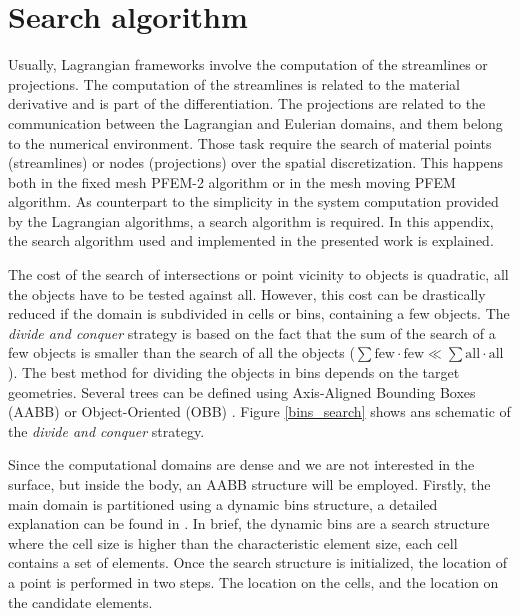 
\chapter{Search algorithm}
\label{search_algorithm}



Usually, Lagrangian frameworks involve the computation of the streamlines or projections. The computation of the streamlines is related to the material derivative and is part of the differentiation. The projections are related to the communication between the Lagrangian and Eulerian domains, and them belong to the numerical environment. Those task require the search of material points (streamlines) or nodes (projections) over the spatial discretization. This happens both in the fixed mesh PFEM-2 algorithm or in the mesh moving PFEM algorithm. As counterpart to the simplicity in the system computation provided by the Lagrangian algorithms, a search algorithm is required. In this appendix, the search algorithm used and implemented in the presented work is explained.

The cost of the search of intersections or point vicinity to objects is quadratic, all the objects have to be tested against all. However, this cost can be drastically reduced if the domain is subdivided in cells or bins, containing a few objects. 
The \emph{divide and conquer} strategy is based on the fact that the sum of the search of a few objects is smaller than the search of all the objects ($\sum\text{few}\cdot\text{few} \ll \sum\text{all}\cdot\text{all}$). The best method for dividing the objects in bins depends on the target geometries. Several trees can be defined using Axis-Aligned Bounding Boxes (AABB) \cite{samet1984} or Object-Oriented (OBB) \cite{gottschalk1996}. Figure \ref{bins_search} shows ans schematic of the \emph{divide and conquer} strategy.

Since the computational domains are dense and we are not interested in the surface, but inside the body, an AABB structure will be employed.
Firstly, the main domain is partitioned using a dynamic bins structure, a detailed explanation can be found in \cite{samet1984}. In brief, the dynamic bins are a search structure where the cell size is higher than the characteristic element size, each cell contains a set of elements. Once the search structure is initialized, the location of a point is performed in two steps. The location on the cells, and the location on the candidate elements.

